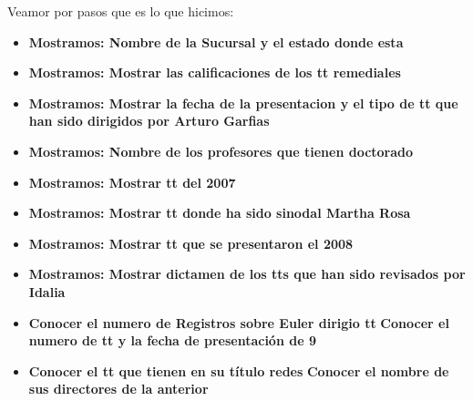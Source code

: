 \documentclass[12pt, fleqn]{article}                             %
\begin{document}
    Veamor por pasos que es lo que hicimos:

    \begin{itemize}

        \item
            \textbf{Mostramos: Nombre de la Sucursal y el estado donde esta}
            

        \item
            \textbf{Mostramos: Mostrar las calificaciones de los tt remediales}
            

        \item
            \textbf{Mostramos: Mostrar la fecha de la presentacion y el tipo de tt que han sido 
                dirigidos por Arturo Garfias}
            

        \item
            \textbf{Mostramos: Nombre de los profesores que tienen doctorado}
            

        \clearpage

        \item
            \textbf{Mostramos: Mostrar tt del 2007}
            


        \item
            \textbf{Mostramos: Mostrar tt donde ha sido sinodal Martha Rosa}
            

        \item
            \textbf{Mostramos: Mostrar tt que se presentaron el 2008}
            

        \item
            \textbf{Mostramos: Mostrar dictamen de los tts que han sido revisados por Idalia}
            


        \clearpage



        \item
            \textbf{Conocer el numero de Registros sobre Euler dirigio tt}
            \textbf{Conocer el numero de tt y la fecha de presentación de 9}
            

        \item
            \textbf{Conocer el tt que tienen en su título redes}
            \textbf{Conocer el nombre de sus directores de la anterior}
            

    \end{itemize}
\end{document}
